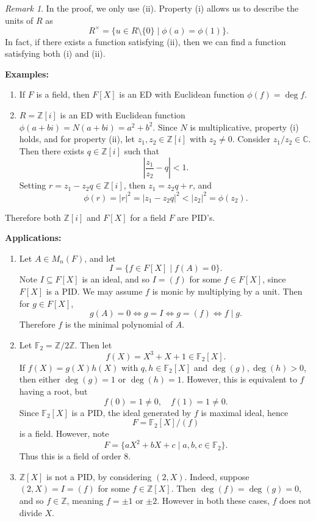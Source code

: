 \documentclass[12pt]{article}
\theoremstyle{definition}
\theoremstyle{remark}
\newtheorem*{remark}{Remark}
\begin{document}
\begin{remark}
	In the proof, we only use (ii). Property (i) allows us to describe the units of $R$ as
			\[
				R^{\times} = \{u \in R \setminus\{0\} \mid \phi(a) = \phi(1)\}
			.\]
			In fact, if there exists a function satisfying (ii), then we can find a function satisfying both (i) and (ii).
\end{remark}

\begin{adjustbox}{minipage = \columnwidth - 25.5pt, margin=1em, frame=1pt, margin=0em}
\textbf{Examples:}
\begin{enumerate}[label = (\roman*)]
	\item If $F$ is a field, then $F[X]$ is an ED with Euclidean function $\phi(f) = \deg f$.
	\item $R = \mathbb{Z}[i]$ is an ED with Euclidean function $\phi(a + bi) = N(a + bi) = a^2 + b^2$. Since $N$ is multiplicative, property (i) holds, and for property (ii), let $z_1, z_2 \in \mathbb{Z}[i]$ with $z_2 \neq 0$. Consider $z_1/z_2 \in \mathbb{C}$. Then there exists $q \in \mathbb{Z}[i]$ such that
		\[
		\left| \frac{z_1}{z_2} - q \right| < 1
		.\]
		Setting $r = z_1 - z_2 q \in \mathbb{Z}[i]$, then $z_1 = z_2q + r$, and
		\[
			\phi(r) = |r|^2 = |z_1 - z_2q|^2 < |z_2|^2 = \phi(z_2)
		.\]
\end{enumerate}
Therefore both $\mathbb{Z}[i]$ and $F[X]$ for a field $F$ are PID's.
\end{adjustbox}

\textbf{Applications:}

\begin{enumerate}[(1)]
	\item Let $A \in M_n(F)$, and let
\[
	I = \{f \in F[X] \mid f(A) = 0\}
.\]
Note $I \subseteq F[X]$ is an ideal, and so $I = (f)$ for some $f \in F[X]$, since $F[X]$ is a PID. We may assume $f$ is monic by multiplying by a unit. Then for $g \in F[X]$,
\[
	g(A) = 0 \iff g = I \iff g = (f) \iff f \mid g
.\]
Therefore $f$ is the minimal polynomial of $A$.
	\item Let $\mathbb{F}_2 = \mathbb{Z} / 2 \mathbb{Z}$. Then let
\[
	f(X) = X^3 + X + 1 \in \mathbb{F}_2[X]
.\]
If $f(X) = g(X)h(X)$ with $q, h \in \mathbb{F}_2[X]$ and $\deg(g), \deg(h) > 0$, then either $\deg(g) = 1$ or $\deg(h) = 1$. However, this is equivalent to $f$ having a root, but
\[
	f(0) = 1 \neq 0, \quad f(1) = 1 \neq 0
.\]
Since $\mathbb{F}_2[X]$ is a PID, the ideal generated by $f$ is maximal ideal, hence
\[
	F = \mathbb{F}_2[X] / (f)
\]
is a field. However, note
\[
	F = \{aX^2 + bX + c \mid a, b, c \in \mathbb{F}_2\}
.\]
Thus this is a field of order 8.
	\item $\mathbb{Z}[X]$ is not a PID, by considering $(2, X)$. Indeed, suppose $(2, X) = I = (f)$ for some $f \in \mathbb{Z}[X]$. Then $\deg (f) = \deg (g) = 0$, and so $f \in \mathbb{Z}$, meaning $f = \pm 1$ or $\pm 2$. However in both these cases, $f$ does not divide $X$.
\end{enumerate}
\end{document}
